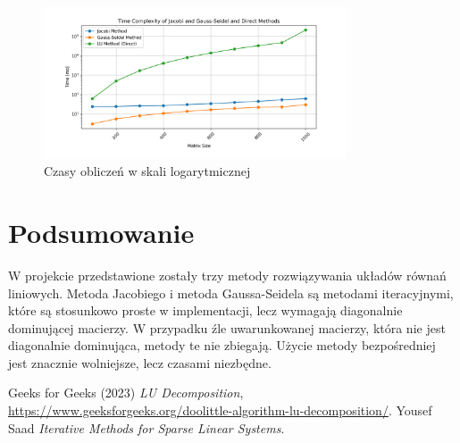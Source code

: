 \documentclass[a4paper,12pt]{article}  %
\begin{document}
\begin{figure}[H]
  \centering
  \includegraphics[width=0.8\textwidth]{./graphs/time_complexity.png}
  \caption{Czasy obliczeń w skali logarytmicznej}
\end{figure}

\pagebreak

\section{Podsumowanie}
W projekcie przedstawione zostały trzy metody rozwiązywania układów równań
liniowych. Metoda Jacobiego i metoda Gaussa-Seidela są metodami
iteracyjnymi, które są stosunkowo proste w implementacji, lecz wymagają
diagonalnie dominującej macierzy. W przypadku źle uwarunkowanej
macierzy, która nie jest diagonalnie dominująca, metody te nie 
zbiegają. Użycie metody bezpośredniej jest znacznie wolniejsze, lecz
czasami niezbędne. 

\begin{thebibliography}{9}
Geeks for Geeks (2023) \emph{LU Decomposition}, \url{https://www.geeksforgeeks.org/doolittle-algorithm-lu-decomposition/}.
Yousef Saad \emph{Iterative Methods for Sparse Linear Systems}.
\end{thebibliography}

\printbibliography
\end{document}
